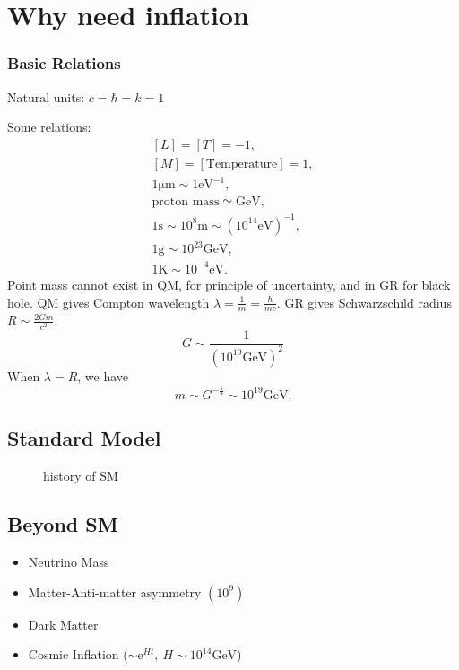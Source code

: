 \chapter{Why need inflation}
\subsection{Basic Relations}
Natural units: $c=\hbar =k =1$

Some relations:
\begin{equation}
  \begin{gathered}
    \left[ L \right] = \left[ T \right] = -1, \\
    \left[ M \right] = \left[ \text{Temperature} \right] = 1, \\
    1 \mathrm{\mu m} \sim 1 \mathrm{eV}^{-1}, \\
    \text{proton mass} \simeq \mathrm{GeV}, \\
    1\mathrm{s} \sim 10^{8} \mathrm{m} \sim \left( 10^{14} \mathrm{eV}\right)^{-1}, \\
    1 \mathrm{g} \sim 10^{23} \mathrm{GeV} ,\\
    1 \mathrm{K} \sim 10^{-4} \mathrm{eV} .
  \end{gathered}
\end{equation}
Point mass cannot exist in QM, for principle of uncertainty, and in GR for black hole.
QM gives Compton wavelength $\lambda = \frac{1}{m} = \frac{\hbar }{mc} $. GR gives Schwarzschild radius $R \sim \frac{2Gm}{c^{2}}$.
\begin{equation}
  G \sim \frac{1}{\left( 10^{19} \mathrm{GeV} \right)^{2}}
\end{equation}
When $\lambda = R$, we have
\begin{equation}
  m \sim G^{-\frac{1}{2}} \sim 10^{19} \mathrm{GeV}.
\end{equation}

\section{Standard Model}

\begin{figure}[ht]
    \centering
    \caption{history of SM}
    \label{fig:history-of-sm}
\end{figure}

\section{Beyond SM}
\begin{itemize}
  \item Neutrino Mass
  \item Matter-Anti-matter asymmetry $(10^{9})$
  \item Dark Matter
  \item Cosmic Inflation ($\sim \mathrm{e}^{Ht}, \ H \sim 10^{14}\mathrm{GeV}$)
\end{itemize}

